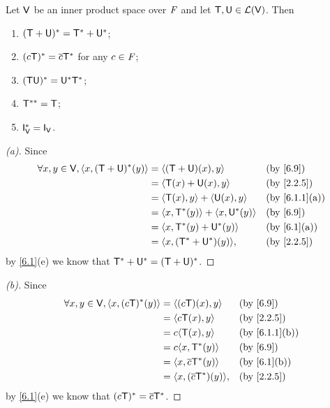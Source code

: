 \begin{thm}\label{6.11}
	Let \(\mathsf{V}\) be an inner product space over \(\mathit{F}\) and let \(\mathsf{T}, \mathsf{U} \in \mathcal{L}(\mathsf{V})\).
	Then
	\begin{enumerate}
		\item \((\mathsf{T} + \mathsf{U})^* = \mathsf{T}^* + \mathsf{U}^*\);
		\item \((c \mathsf{T})^* = \overline{c} \mathsf{T}^*\) for any \(c \in \mathit{F}\);
		\item \((\mathsf{T} \mathsf{U})^* = \mathsf{U}^* \mathsf{T}^*\);
		\item \(\mathsf{T}^{**} = \mathsf{T}\);
		\item \(\IT[\V]^* = \IT[\V]\).
	\end{enumerate}
\end{thm}

\begin{proof}[(a)]
	Since
	\begin{align*}
		\forall x, y \in \V, \inn{x, (\T + \U)^*(y)} & = \inn{(\T + \U)(x), y}               &  & \by{6.9}      \\
		                                             & = \inn{\T(x) + \U(x), y}              &  & \by{2.2.5}    \\
		                                             & = \inn{\T(x), y} + \inn{\U(x), y}     &  & \by{6.1.1}[a] \\
		                                             & = \inn{x, \T^*(y)} + \inn{x, \U^*(y)} &  & \by{6.9}      \\
		                                             & = \inn{x, \T^*(y) + \U^*(y)}          &  & \by{6.1}[a]   \\
		                                             & = \inn{x, (\T^* + \U^*)(y)},          &  & \by{2.2.5}
	\end{align*}
	by \cref{6.1}(e) we know that \(\mathsf{T}^* + \mathsf{U}^* = (\mathsf{T} + \mathsf{U})^*\).
\end{proof}

\begin{proof}[(b)]
	Since
	\begin{align*}
		\forall x, y \in \V, \inn{x, (c \T)^*(y)} & = \inn{(c \T)(x), y}           &  & \by{6.9}      \\
		                                          & = \inn{c \T(x), y}             &  & \by{2.2.5}    \\
		                                          & = c \inn{\T(x), y}             &  & \by{6.1.1}[b] \\
		                                          & = c \inn{x, \T^*(y)}           &  & \by{6.9}      \\
		                                          & = \inn{x, \conj{c} \T^*(y)}    &  & \by{6.1}[b]   \\
		                                          & = \inn{x, (\conj{c} \T^*)(y)}, &  & \by{2.2.5}
	\end{align*}
	by \cref{6.1}(e) we know that \((c \mathsf{T})^* = \overline{c} \mathsf{T}^*\).
\end{proof}

